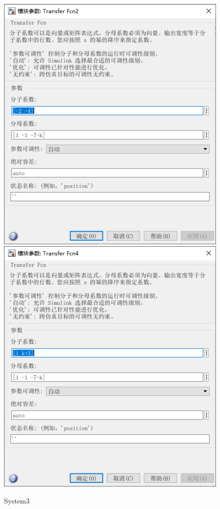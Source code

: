 \documentclass[12pt,a4paper,oneside]{ctexart}
\begin{document}
    \newpage
    \begin{figure}[H]
        \includegraphics[height = 0.35\textheight]{../screenshots/MT1S3Tran1.PNG}
        \includegraphics[height = 0.35\textheight]{../screenshots/MT1S3Tran2.PNG}
        \caption{System3}
    \end{figure}
\end{document}
